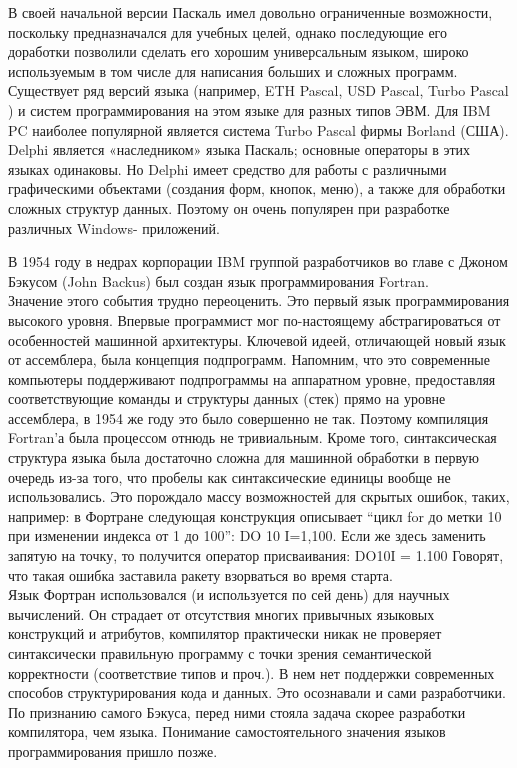 В своей начальной версии Паскаль имел довольно ограниченные возможности, поскольку предназначался для учебных целей, однако последующие его доработки позволили сделать его хорошим универсальным языком, широко используемым в том числе для написания больших и сложных программ. Существует ряд версий языка (например, ETH Pascal, USD Pascal, Turbo Pascal ) и систем программирования на этом языке для разных типов ЭВМ. Для IBM PC наиболее популярной является система Turbo Pascal фирмы Borland (США). \\

Delphi является «наследником» языка Паскаль; основные операторы в этих языках одинаковы. Но Delphi имеет средство для работы с различными графическими объектами (создания форм, кнопок, меню), а также для обработки сложных структур данных. Поэтому он очень популярен при разработке различных Windows- приложений. \\


В 1954 году в недрах корпорации IBM группой разработчиков во главе с Джоном Бэкусом (John Backus) был создан язык программирования Fortran. \\

Значение этого события трудно переоценить. Это первый язык программирования высокого уровня. Впервые программист мог по-настоящему абстрагироваться от особенностей машинной архитектуры. Ключевой идеей, отличающей новый язык от ассемблера, была концепция подпрограмм. Напомним, что это современные компьютеры поддерживают подпрограммы на аппаратном уровне, предоставляя соответствующие команды и структуры данных (стек) прямо на уровне ассемблера, в 1954 же году это было совершенно не так. Поэтому компиляция Fortran’а была процессом отнюдь не тривиальным. Кроме того, синтаксическая структура языка была достаточно сложна для машинной обработки в первую очередь из-за того, что пробелы как синтаксические единицы вообще не использовались. Это порождало массу возможностей для скрытых ошибок, таких, например: в Фортране следующая конструкция описывает “цикл for до метки 10 при изменении индекса от 1 до 100”: DO 10 I=1,100. Если же здесь заменить запятую на точку, то получится оператор присваивания: DO10I = 1.100 Говорят, что такая ошибка заставила ракету взорваться во время старта. \\

Язык Фортран использовался (и используется по сей день) для научных вычислений. Он страдает от отсутствия многих привычных языковых конструкций и атрибутов, компилятор практически никак не проверяет синтаксически правильную программу с точки зрения семантической корректности (соответствие типов и проч.). В нем нет поддержки современных способов структурирования кода и данных. Это осознавали и сами разработчики. По признанию самого Бэкуса, перед ними стояла задача скорее разработки компилятора, чем языка. Понимание самостоятельного значения языков программирования пришло позже. \\

